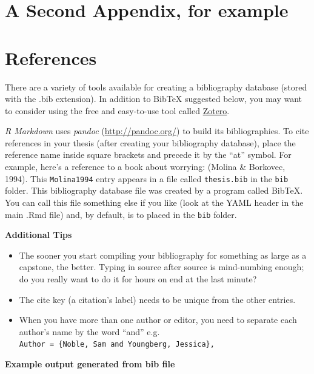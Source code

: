\documentclass[12pt,oneside]{chicagocapstone}
\providecommand{\tightlist}{%
  \setlength{\itemsep}{0pt}\setlength{\parskip}{0pt}}
\begin{document}
\hypertarget{a-second-appendix-for-example}{%
\chapter{A Second Appendix, for example}\label{a-second-appendix-for-example}}

\backmatter

\hypertarget{references}{%
\chapter*{References}\label{references}}


\noindent

\setlength{\parindent}{-0.20in}
\setlength{\leftskip}{0.20in}
\setlength{\parskip}{8pt}

There are a variety of tools available for creating a bibliography database (stored with the .bib extension). In addition to BibTeX suggested below, you may want to consider using the free and easy-to-use tool called \href{https://www.zotero.org/}{Zotero}.

\emph{R Markdown} uses \emph{pandoc} (\url{http://pandoc.org/}) to build its bibliographies. To cite references in your thesis (after creating your bibliography database), place the reference name inside square brackets and precede it by the ``at'' symbol. For example, here's a reference to a book about worrying: (Molina \& Borkovec, 1994). This \texttt{Molina1994} entry appears in a file called \texttt{thesis.bib} in the \texttt{bib} folder. This bibliography database file was created by a program called BibTeX. You can call this file something else if you like (look at the YAML header in the main .Rmd file) and, by default, is to placed in the \texttt{bib} folder.

\textbf{Additional Tips}
\begin{itemize}
\tightlist
\item
  The sooner you start compiling your bibliography for something as large as a capstone, the better. Typing in source after source is mind-numbing enough; do you really want to do it for hours on end at the last minute?
\item
  The cite key (a citation's label) needs to be unique from the other entries.
\item
  When you have more than one author or editor, you need to separate each author's name by the word ``and'' e.g. \texttt{Author\ =\ \{Noble,\ Sam\ and\ Youngberg,\ Jessica\},}
\end{itemize}
\textbf{Example output generated from bib file}
\end{document}
